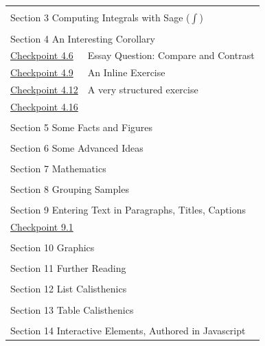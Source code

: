 \documentclass[pdflatex]{sn-jnl}
\theoremstyle{thmstyleone}%
\theoremstyle{thmstyletwo}%
\theoremstyle{thmstylethree}%
\numberwithin{equation}{section}
\begin{document}
\begin{appendices}
\begin{longtable}[l]{ll}
\multicolumn{2}{l}{\null}\\[1.5ex] \multicolumn{2}{l}{\large Section 3 Computing Integrals with Sage (\(\int\))}\\[0.5ex]
\multicolumn{2}{l}{\null}\\[1.5ex] \multicolumn{2}{l}{\large Section 4 An Interesting Corollary}\\[0.5ex]
\hyperref[exercise-essay]{Checkpoint 4.6}& Essay Question: Compare and Contrast\\
\hyperref[inline-exercise]{Checkpoint 4.9}& An Inline Exercise\\
\hyperref[exercise-structured]{Checkpoint 4.12}& A very structured exercise\\
\hyperref[subsection-intro-conclude-4-3]{Checkpoint 4.16}& \\
\multicolumn{2}{l}{\null}\\[1.5ex] \multicolumn{2}{l}{\large Section 5 Some Facts and Figures}\\[0.5ex]
\multicolumn{2}{l}{\null}\\[1.5ex] \multicolumn{2}{l}{\large Section 6 Some Advanced Ideas}\\[0.5ex]
\multicolumn{2}{l}{\null}\\[1.5ex] \multicolumn{2}{l}{\large Section 7 Mathematics}\\[0.5ex]
\multicolumn{2}{l}{\null}\\[1.5ex] \multicolumn{2}{l}{\large Section 8 Grouping Samples}\\[0.5ex]
\multicolumn{2}{l}{\null}\\[1.5ex] \multicolumn{2}{l}{\large Section 9 Entering Text in Paragraphs, Titles, Captions}\\[0.5ex]
\hyperref[subsection-xml-escape-7]{Checkpoint 9.1}& \\
\multicolumn{2}{l}{\null}\\[1.5ex] \multicolumn{2}{l}{\large Section 10 Graphics}\\[0.5ex]
\multicolumn{2}{l}{\null}\\[1.5ex] \multicolumn{2}{l}{\large Section 11 Further Reading}\\[0.5ex]
\multicolumn{2}{l}{\null}\\[1.5ex] \multicolumn{2}{l}{\large Section 12 List Calisthenics}\\[0.5ex]
\multicolumn{2}{l}{\null}\\[1.5ex] \multicolumn{2}{l}{\large Section 13 Table Calisthenics}\\[0.5ex]
\multicolumn{2}{l}{\null}\\[1.5ex] \multicolumn{2}{l}{\large Section 14 Interactive Elements, Authored in Javascript}\\[0.5ex]

\end{longtable}
\end{appendices}
\end{document}
